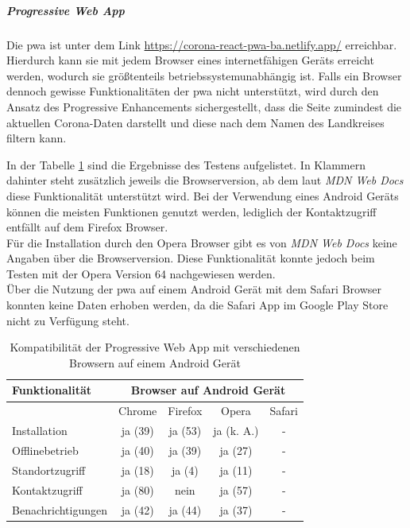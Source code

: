 \subparagraph{Progressive Web App\\}
Die \ac{pwa} ist unter dem Link \url{https://corona-react-pwa-ba.netlify.app/} erreichbar.
Hierdurch kann sie mit jedem Browser eines internetfähigen Geräts erreicht werden, wodurch sie größtenteils betriebssystemunabhängig ist.
Falls ein Browser dennoch gewisse Funktionalitäten der \ac{pwa} nicht unterstützt, wird durch den Ansatz des Progressive Enhancements sichergestellt, dass die Seite zumindest die aktuellen Corona-Daten darstellt und diese nach dem Namen des Landkreises filtern kann.

In der Tabelle \ref{fig:compability_android} sind die Ergebnisse des Testens aufgelistet.
In Klammern dahinter steht zusätzlich jeweils die Browserversion, ab dem laut \textit{MDN Web Docs} diese Funktionalität unterstützt wird.
Bei der Verwendung eines Android Geräts können die meisten Funktionen genutzt werden, lediglich der Kontaktzugriff entfällt auf dem Firefox Browser.\\
Für die Installation durch den Opera Browser gibt es von \textit{MDN Web Docs} keine Angaben über die Browserversion.
Diese Funktionalität konnte jedoch beim Testen mit der Opera Version 64 nachgewiesen werden.\\
Über die Nutzung der \ac{pwa} auf einem Android Gerät mit dem Safari Browser konnten keine Daten erhoben werden, da die Safari App im Google Play Store nicht zu Verfügung steht.

\begin{table}[ht]
\centering
\caption{Kompatibilität der Progressive Web App mit verschiedenen Browsern auf einem Android Gerät}
\begin{tabular}{|l|c|c|c|c|}
\hline
\textbf{Funktionalität} & \multicolumn{4}{c|}{\textbf{Browser auf Android Gerät}} \\ \hline
                        & Chrome      & Firefox     & Opera          & Safari    \\ \hline
Installation            & ja (39)     & ja (53)     & ja (k. A.)     & -         \\ \hline
Offlinebetrieb          & ja (40)     & ja (39)     & ja (27)        & -         \\ \hline
Standortzugriff         & ja (18)     & ja (4)      & ja (11)        & -         \\ \hline
Kontaktzugriff          & ja (80)     & nein        & ja (57)        & -         \\ \hline
Benachrichtigungen      & ja (42)     & ja (44)     & ja (37)        & -    \\ \hline
\end{tabular}
\label{fig:compability_android}
\end{table}

